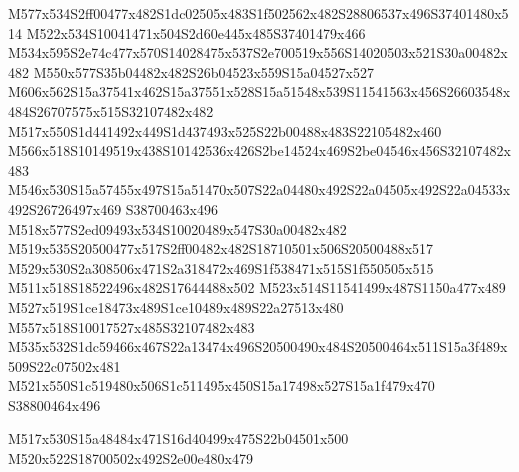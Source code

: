 \documentclass{article}
\begin{document}
\begin{multicols}{2}
M577x534S2ff00477x482S1dc02505x483S1f502562x482S28806537x496S37401480x514 M522x534S10041471x504S2d60e445x485S37401479x466 M534x595S2e74c477x570S14028475x537S2e700519x556S14020503x521S30a00482x482 M550x577S35b04482x482S26b04523x559S15a04527x527 M606x562S15a37541x462S15a37551x528S15a51548x539S11541563x456S26603548x484S26707575x515S32107482x482 M517x550S1d441492x449S1d437493x525S22b00488x483S22105482x460 M566x518S10149519x438S10142536x426S2be14524x469S2be04546x456S32107482x483 M546x530S15a57455x497S15a51470x507S22a04480x492S22a04505x492S22a04533x492S26726497x469 S38700463x496 M518x577S2ed09493x534S10020489x547S30a00482x482 M519x535S20500477x517S2ff00482x482S18710501x506S20500488x517 M529x530S2a308506x471S2a318472x469S1f538471x515S1f550505x515 M511x518S18522496x482S17644488x502 M523x514S11541499x487S1150a477x489 M527x519S1ce18473x489S1ce10489x489S22a27513x480 M557x518S10017527x485S32107482x483 M535x532S1dc59466x467S22a13474x496S20500490x484S20500464x511S15a3f489x509S22c07502x481 M521x550S1c519480x506S1c511495x450S15a17498x527S15a1f479x470 S38800464x496

\begin{center}
M517x530S15a48484x471S16d40499x475S22b04501x500 M520x522S18700502x492S2e00e480x479 
\end{center}








\end{multicols}
\end{document}
